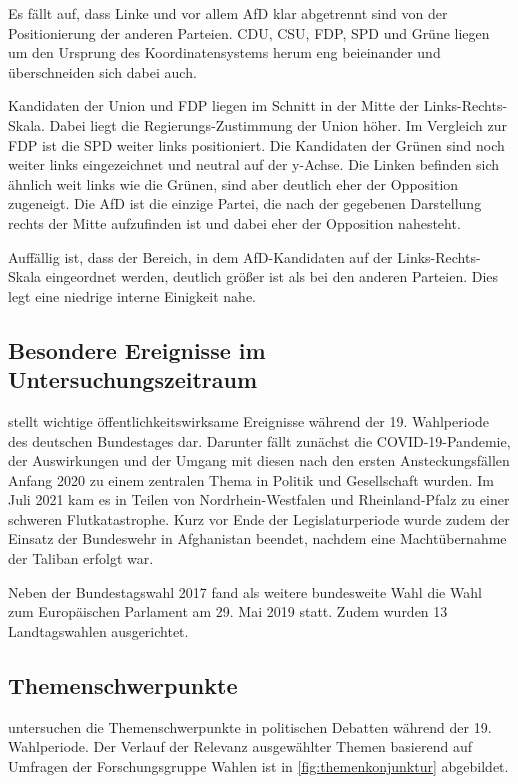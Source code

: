 Es fällt auf, dass Linke und vor allem \ac{AfD} klar abgetrennt sind von der Positionierung der anderen Parteien. \ac{CDU}, \ac{CSU}, \ac{FDP}, \ac{SPD} und Grüne liegen um den Ursprung des Koordinatensystems herum eng beieinander und überschneiden sich dabei auch.

Kandidaten der Union und \ac{FDP} liegen im Schnitt in der Mitte der Links-Rechts-Skala. Dabei liegt die Regierungs-Zustimmung der Union höher. Im Vergleich zur \ac{FDP} ist die \ac{SPD} weiter links positioniert. Die Kandidaten der Grünen sind noch weiter links eingezeichnet und neutral auf der y-Achse. Die Linken befinden sich ähnlich weit links wie die Grünen, sind aber deutlich eher der Opposition zugeneigt. Die \ac{AfD} ist die einzige Partei, die nach der gegebenen Darstellung rechts der Mitte aufzufinden ist und dabei eher der Opposition nahesteht.

Auffällig ist, dass der Bereich, in dem \ac{AfD}-Kandidaten auf der Links-Rechts-Skala eingeordnet werden, deutlich größer ist als bei den anderen Parteien. Dies legt eine niedrige interne Einigkeit nahe.

\subsection{Besondere Ereignisse im Untersuchungszeitraum} \label{subsec:besondereEreignisse}

\textcite{schmid_deutscher_2021} stellt wichtige öffentlichkeitswirksame Ereignisse während der 19. Wahlperiode des deutschen Bundestages dar. Darunter fällt zunächst die \ac{COVID-19}-Pandemie, der Auswirkungen und der Umgang mit diesen nach den ersten Ansteckungsfällen Anfang 2020 zu einem zentralen Thema in Politik und Gesellschaft wurden. Im Juli 2021 kam es in Teilen von Nordrhein-Westfalen und Rheinland-Pfalz zu einer schweren Flutkatastrophe. Kurz vor Ende der Legislaturperiode wurde zudem der Einsatz der Bundeswehr in Afghanistan beendet, nachdem eine Machtübernahme der Taliban erfolgt war.

Neben der Bundestagswahl 2017 fand als weitere bundesweite Wahl die Wahl zum Europäischen Parlament am 29. Mai 2019 statt. Zudem wurden 13 Landtagswahlen ausgerichtet.

\subsection{Themenschwerpunkte} \label{subsec:themenschwerpunkte}

\textcite{engler_wettbewerb_2022} untersuchen die Themenschwerpunkte in politischen Debatten während der 19. Wahlperiode. Der Verlauf der Relevanz ausgewählter Themen basierend auf Umfragen der Forschungsgruppe Wahlen ist in \autoref{fig:themenkonjunktur} abgebildet.

